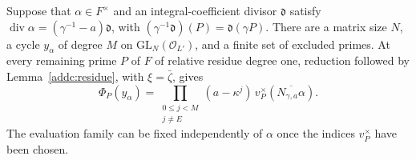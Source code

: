 \begin{theorem}\label{addc:cycle}
Suppose that \(\alpha\in F^\times\) and an integral-coefficient
divisor \(\mathfrak d\) satisfy
\(\operatorname{div}\alpha=(\gamma^{-1}-a)\mathfrak d\), with
\((\gamma^{-1}\mathfrak d)(P)=\mathfrak d(\gamma P)\).
There are a matrix size \(N\), a cycle \(y_\alpha\) of degree \(M\)
on \(\mathrm{GL}_N(\mathcal O_{L'})\), and a finite set of excluded
primes. At every remaining prime \(P\) of \(F\) of relative residue
degree one, reduction followed by Lemma~\ref{addc:residue}, with
\(\xi=\bar\zeta\), gives
\[
 \Phi_P(y_\alpha)=
  \prod_{\substack{0\le j<M\\j\ne E}}(a-\kappa^j)\,
       v_P^\times\!\left(\overline{N_{\gamma,a}\alpha}\right).
\]
The evaluation family can be fixed independently of \(\alpha\) once
the indices \(v_P^\times\) have been chosen.
\end{theorem}
